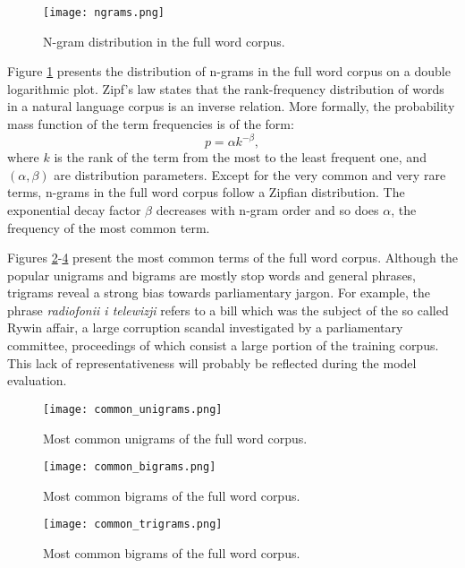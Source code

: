 \begin{figure}[!htbp]
	  \centering
	  \texttt{[image: ngrams.png]}
      \caption{N-gram distribution in the full word corpus.}
      \label{figure:ngramdistribution}
\end{figure}

Figure \ref{figure:ngramdistribution} presents the distribution of n-grams in the full word corpus on a double logarithmic plot. Zipf's law states that the rank-frequency distribution of words in a natural language corpus is an inverse relation. More formally, the probability mass function of the term frequencies is of the form:
\begin{equation}
	p=\alpha k^{-\beta},
	\label{equation:zipf}
\end{equation}
where $k$ is the rank of the term from the most to the least frequent one, and $(\alpha, \beta)$ are distribution parameters. Except for the very common and very rare terms, n-grams in the full word corpus follow a Zipfian distribution. The exponential decay factor $\beta$ decreases with n-gram order and so does $\alpha$, the frequency of the most common term.

Figures \ref{figure:commonunigrams}-\ref{figure:commontrigrams} present the most common terms of the full word corpus. Although the popular unigrams and bigrams are mostly stop words and general phrases, trigrams reveal a strong bias towards parliamentary jargon. For example, the phrase \textit{radiofonii i telewizji} refers to a bill which was the subject of the so called Rywin affair, a large corruption scandal investigated by a parliamentary committee, proceedings of which consist a large portion of the training corpus. This lack of representativeness will probably be reflected during the model evaluation.

\begin{figure}[!htbp]
	  \centering
	  \texttt{[image: common\_unigrams.png]}
	      \caption{Most common unigrams of the full word corpus.}
	      \label{figure:commonunigrams}
\end{figure}

\begin{figure}[!htbp]
	  \centering
	  \texttt{[image: common\_bigrams.png]}
	      \caption{Most common bigrams of the full word corpus.}
	      \label{figure:commonbigrams}
\end{figure}

\begin{figure}[!htbp]
	  \centering
	  \texttt{[image: common\_trigrams.png]}
	      \caption{Most common bigrams of the full word corpus.}
	      \label{figure:commontrigrams}
\end{figure}

